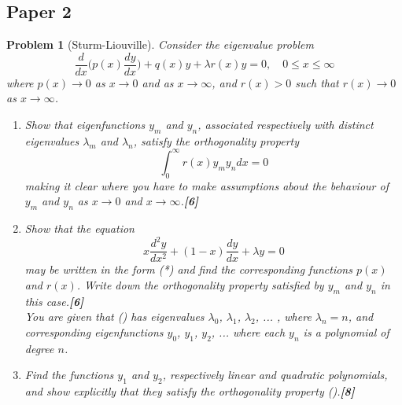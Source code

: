 \documentclass[a4paper]{article}
\theoremstyle{new}
\newtheorem{qns}{Problem}[section]
\begin{document}
\subsection{Paper 2}
\begin{qns}[Sturm-Liouville]
Consider the eigenvalue problem
\begin{equation}
    \frac{d}{dx}\bigg(p(x)\frac{dy}{dx}\bigg)+q(x)y+\lambda r(x)y=0,\quad 0\leq x\leq\infty\tag{*}
\end{equation}
where $p(x)\rightarrow0$ as $x\rightarrow0$ and as $x\rightarrow\infty$, and $r(x) > 0$ such that $r(x)\rightarrow0$ as $x\rightarrow\infty$.
\begin{enumerate}[label=(\roman*)]
\item Show that eigenfunctions $y_m$ and $y_n$, associated respectively with distinct eigenvalues $\lambda_m$ and $\lambda_n$, satisfy the orthogonality property
\begin{equation}
    \int_0^\infty r(x)y_my_ndx=0\tag{\dag}
\end{equation}
making it clear where you have to make assumptions about the behaviour of $y_m$ and $y_n$ as $x\rightarrow0$ and $x\rightarrow\infty$.\hfill\textbf{[6]}
\item Show that the equation
\begin{equation}
    x\frac{d^2y}{dx^2}+(1-x)\frac{dy}{dx}+\lambda y=0\tag{\ddag}
\end{equation}
may be written in the form (*) and find the corresponding functions $p(x)$ and $r(x)$. Write down the orthogonality property satisfied by $y_m$ and $y_n$ in this case.\hfill\textbf{[6]}\\[5pt]
You are given that (\ddag) has eigenvalues $\lambda_0$, $\lambda_1$, $\lambda_2$, ... , where $\lambda_n=n$, and corresponding eigenfunctions $y_0$, $y_1$, $y_2$, ... where each $y_n$ is a polynomial of degree $n$.
\item Find the functions $y_1$ and $y_2$, respectively linear and quadratic polynomials, and show explicitly that they satisfy the orthogonality property (\dag).\hfill\textbf{[8]}
\end{enumerate}
\end{qns}
\end{document}
